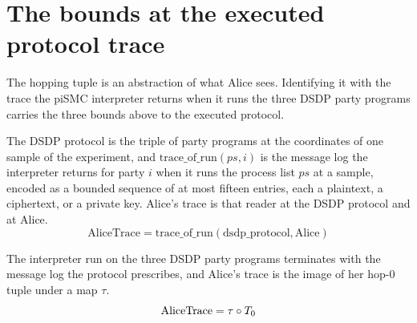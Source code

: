 \chapter{The bounds at the executed protocol trace}
\label{ch:trace_link}

The hopping tuple is an abstraction of what Alice sees. Identifying it with the
trace the piSMC interpreter returns when it runs the three DSDP party programs
carries the three bounds above to the executed protocol.

\begin{definition}
  \label{def:alice_trace}
  \rocqok
  The DSDP protocol is the triple of party programs at the coordinates of one
  sample of the experiment, and $\mathrm{trace\_of\_run}(\mathit{ps}, i)$ is the
  message log the interpreter returns for party $i$ when it runs the process
  list $\mathit{ps}$ at a sample, encoded as a bounded sequence of at most
  fifteen entries, each a plaintext, a ciphertext, or a private key. Alice's
  trace is that reader at the DSDP protocol and at Alice.
  \[ \mathrm{AliceTrace} = \mathrm{trace\_of\_run}(\mathrm{dsdp\_protocol},
       \mathrm{Alice}) \]
\end{definition}

\begin{lemma}
  \label{lem:trace_of_hop_tuple}
  \rocqok
  The interpreter run on the three DSDP party programs terminates with the
  message log the protocol prescribes, and Alice's trace is the image of her
  hop-$0$ tuple under a map $\tau$.
  \[ \mathrm{AliceTrace} = \tau \circ T_{0} \]
\end{lemma}

